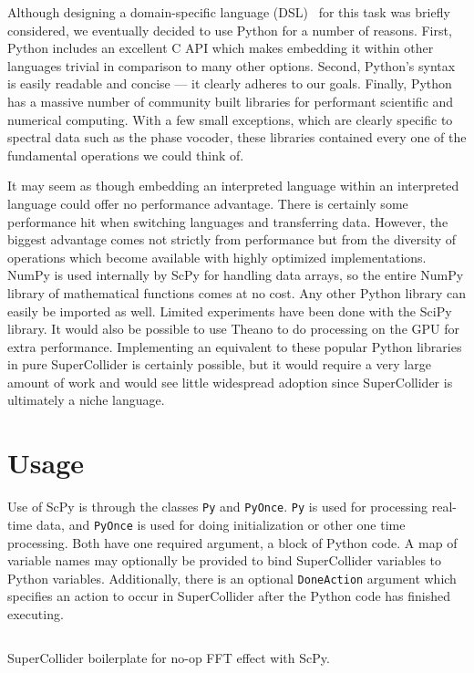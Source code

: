 \documentclass{article}
\begin{document}
Although designing a domain-specific language (DSL)~\cite{van2000domain} for this task was briefly
considered, we eventually decided to use Python for a number of reasons. First, Python includes an
excellent C API which makes embedding it within other languages trivial in comparison to many other
options.  Second, Python's syntax is easily readable and concise --- it clearly adheres to our
goals. Finally, Python has a massive number of community built libraries for performant scientific
and numerical computing. With a few small exceptions, which are clearly specific to spectral data
such as the phase vocoder, these libraries contained every one of the fundamental operations we
could think of.

It may seem as though embedding an interpreted language within an interpreted language could offer
no performance advantage. There is certainly some performance hit when switching languages and
transferring data. However, the biggest advantage comes not strictly from performance but from the
diversity of operations which become available with highly optimized implementations. NumPy is used
internally by ScPy for handling data arrays, so the entire NumPy library of mathematical functions
comes at no cost.  Any other Python library can easily be imported as well. Limited experiments
have been done with the SciPy library. It would also be possible to use Theano to do processing on
the GPU for extra performance. Implementing an equivalent to these popular Python libraries in pure
SuperCollider is certainly possible, but it would require a very large amount of work and would see
little widespread adoption since SuperCollider is ultimately a niche language.

\section{Usage}\label{sec:usage}

Use of ScPy is through the classes \texttt{Py} and \texttt{PyOnce}. \texttt{Py} is used for
processing real-time data, and \texttt{PyOnce} is used for doing initialization or other one time
processing. Both have one required argument, a block of Python code. A map of variable names may
optionally be provided to bind SuperCollider variables to Python variables.  Additionally, there is
an optional \texttt{DoneAction} argument which specifies an action to occur in SuperCollider after
the Python code has finished executing.

\begin{listing}[H]
    \inputminted[linenos=true]{SuperCollider}{../examples/template.sc}
    \caption{SuperCollider boilerplate for no-op FFT effect with ScPy.}
    \label{lst:boilerplate}
\end{listing}
\end{document}
